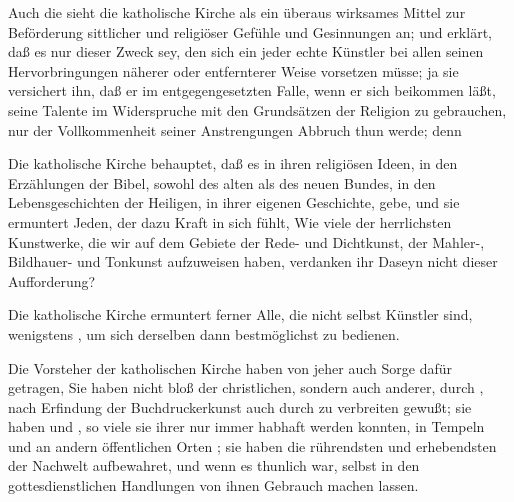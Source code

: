 \begin{RWanm}
\end{RWanm}

\begin{aufza}
\item Auch die  sieht die katholische Kirche als ein überaus wirksames Mittel zur Beförderung sittlicher und religiöser Gefühle und Gesinnungen an; und erklärt, daß es nur dieser Zweck sey, den sich ein jeder echte Künstler bei allen seinen Hervorbringungen näherer oder entfernterer Weise vorsetzen müsse; ja sie versichert ihn, daß er im entgegengesetzten Falle, wenn er sich beikommen läßt, seine Talente im Widerspruche mit den Grundsätzen der Religion zu gebrauchen, nur der Vollkommenheit seiner Anstrengungen Abbruch thun werde; denn ~
\item Die katholische Kirche behauptet, daß es in ihren religiösen Ideen, in den Erzählungen der Bibel, sowohl des alten als des neuen Bundes, in den Lebensgeschichten der Heiligen, in ihrer eigenen Geschichte,  gebe, und sie ermuntert Jeden, der dazu Kraft in sich fühlt,  Wie viele der herrlichsten Kunstwerke, die wir auf dem Gebiete der Rede- und Dichtkunst, der Mahler-, Bildhauer- und Tonkunst aufzuweisen haben, verdanken ihr Daseyn nicht dieser Aufforderung?
\item Die katholische Kirche ermuntert ferner Alle, die nicht selbst Künstler sind, wenigstens , um sich derselben dann  bestmöglichst zu bedienen.
\item Die Vorsteher der katholischen Kirche haben von jeher auch Sorge dafür getragen,  Sie haben  nicht bloß der christlichen, sondern auch anderer, durch , nach Erfindung der Buchdruckerkunst auch durch  zu verbreiten gewußt; sie haben  und , so viele sie ihrer nur immer habhaft werden konnten, in Tempeln und an andern öffentlichen Orten ; sie haben die rührendsten und erhebendsten  der Nachwelt aufbewahret, und wenn es thunlich war, selbst in den gottesdienstlichen Handlungen von ihnen Gebrauch machen lassen.

\end{aufza}
